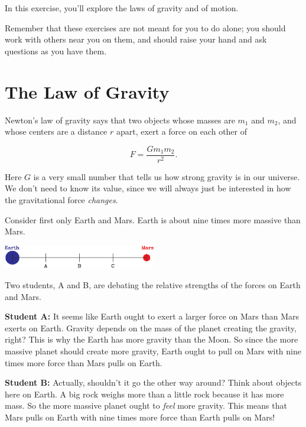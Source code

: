 \documentclass[12pt]{article}
\begin{document}
\Large
\centerline{}

\normalsize

In this exercise, you'll explore the laws of gravity and of motion.

Remember that these exercises are not meant for you to do alone; you should work with others near you on them, and should raise your hand and ask questions as you have them.

\section{The Law of Gravity}

Newton's law of gravity says that two objects whose masses are $m_1$ and $m_2$, and whose centers
are a distance $r$ apart, exert a force on each other of 

$$
F = \frac{Gm_1m_2}{r^2}.
$$

Here $G$ is a very small number that tells us how strong gravity is in our universe. We don't need to
know its value, since we will always just be interested in how the gravitational force {\it changes}.


Consider first only Earth and Mars. Earth is about nine times more massive than Mars.

\begin{center}
\includegraphics[width=0.5\textwidth]{earth-mars-crop.pdf}
\end{center}

 Two students, A and B, are debating the relative strengths of the forces on Earth and Mars.
	
	\begin{center}
		

	\begin{minipage}{0.9\textwidth}{\bf Student A:} It seems like Earth ought to exert a larger force on Mars than Mars exerts on Earth. Gravity depends on the mass of the planet creating the gravity, right? This is why the Earth has more gravity than the Moon. So since the more massive planet should create more gravity, Earth ought to pull on Mars with nine times more force than Mars pulls on Earth.
	
	\bigskip
	
	{\bf Student B:} Actually, shouldn't it go the other way around? Think about objects here on Earth. A big rock weighs more than a little rock because it has more mass. So the more massive planet ought to {\it feel} more gravity. This means that Mars pulls on Earth with nine times more force than Earth pulls on Mars!
	\end{minipage}
	\end{center}
\end{document}
